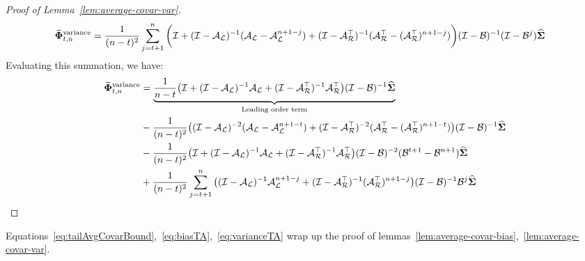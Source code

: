 \begin{proof}[Proof of Lemma~\ref{lem:average-covar-var}]
{\small
\begin{align}
\boldsymbol{\bar{\Phi}}_{t,n}^{\text{variance}}&=\frac{1}{(n-t)^2}\sum_{j=t+1}^n\bigg( \mathcal{I} + (\mathcal{I}-\mathcal{A}_{\mathcal{L}})^{-1}(\mathcal{A}_{\mathcal{L}}-\mathcal{A}_{\mathcal{L}}^{n+1-j}) + (\mathcal{I}-\mathcal{A}_{\mathcal{R}}^{\top})^{-1}(\mathcal{A}_{\mathcal{R}}^{\top}-(\mathcal{A}_{\mathcal{R}}^{\top})^{n+1-j}) \bigg)(\mathcal{I}-\mathcal{B})^{-1}(\mathcal{I}-\mathcal{B}^j)\mathbf{\widehat{\Sigma}}\nonumber
\end{align}
}
Evaluating this summation, we have:
\begin{align}
\label{eq:varianceTA}
\phivb_{t,n}^{\text{variance}}&=\underbrace{\frac{1}{n-t}\big(\eyeT + (\eyeT-\AL)^{-1}\AL + (\eyeT-\AR\T)^{-1}\AR\T\big)(\eyeT-\BT)^{-1}\Sigh}_{\text{Leading order term}}\nonumber\\&-\frac{1}{(n-t)^2}\big((\eyeT-\AL)^{-2}(\AL-\AL^{n+1-t})+(\eyeT-\AR\T)^{-2}(\AR\T-(\AR\T)^{n+1-t})\big)(\eyeT-\BT)^{-1}\Sigh\nonumber\\&-\frac{1}{(n-t)^2}\big(\eyeT + (\eyeT-\AL)^{-1}\AL + (\eyeT-\AR\T)^{-1}\AR\T\big)(\eyeT-\BT)^{-2}(\BT^{t+1}-\BT^{n+1})\Sigh\nonumber\\&+\frac{1}{(n-t)^2}\sum_{j=t+1}^n\big((\eyeT-\AL)^{-1}\AL^{n+1-j}+(\eyeT-\AR\T)^{-1}(\AR\T)^{n+1-j}\big)(\eyeT-\BT)^{-1}\BT^j\Sigh
\end{align}

\end{proof}

Equations~\ref{eq:tailAvgCovarBound},~\ref{eq:biasTA},~\ref{eq:varianceTA} wrap up the proof of lemmas~\ref{lem:average-covar-bias},~\ref{lem:average-covar-var}.

